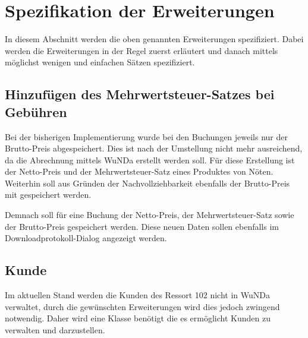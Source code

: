\section{Spezifikation der Erweiterungen} \label{sec:spezifikation}
In diesem Abschnitt werden die oben genannten Erweiterungen spezifiziert. Dabei werden die Erweiterungen in der Regel zuerst erläutert und danach mittels möglichst wenigen und einfachen Sätzen spezifiziert.

\subsection{Hinzufügen des Mehrwertsteuer-Satzes bei Gebühren}
Bei der bisherigen Implementierung wurde bei den Buchungen jeweils nur der Brutto-Preis abgespeichert. Dies ist nach der Umstellung nicht mehr ausreichend, da die Abrechnung mittels \ac{WuNDa} erstellt werden soll. Für diese Erstellung ist der Netto-Preis und der Mehrwertsteuer-Satz eines Produktes von Nöten. Weiterhin soll aus Gründen der Nachvollziehbarkeit ebenfalls der Brutto-Preis mit gespeichert werden.

Demnach soll für eine Buchung der Netto-Preis, der Mehrwertsteuer-Satz sowie der Brutto-Preis gespeichert werden. Diese neuen Daten sollen ebenfalls im Downloadprotokoll-Dialog angezeigt werden.
\subsection{Kunde}
Im aktuellen Stand werden die Kunden des Ressort 102 nicht in \ac{WuNDa} verwaltet, durch die gewünschten Erweiterungen wird dies jedoch zwingend notwendig. Daher wird eine Klasse  benötigt die es ermöglicht Kunden zu verwalten und darzustellen. 

